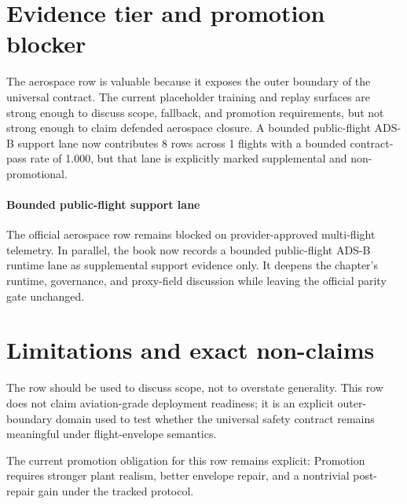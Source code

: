 \section{{Evidence tier and promotion blocker}}
The aerospace row is valuable because it exposes the outer boundary of the universal contract. The current placeholder training and replay surfaces are strong enough to discuss scope, fallback, and promotion requirements, but not strong enough to claim defended aerospace closure. A bounded public-flight ADS-B support lane now contributes 8 rows across 1 flights with a bounded contract-pass rate of 1.000, but that lane is explicitly marked supplemental and non-promotional.


\paragraph{Bounded public-flight support lane}
The official aerospace row remains blocked on provider-approved multi-flight telemetry.
In parallel, the book now records a bounded public-flight ADS-B runtime lane as supplemental
support evidence only.  It deepens the chapter's runtime, governance, and proxy-field
discussion while leaving the official parity gate unchanged.




\section{{Limitations and exact non-claims}}
The row should be used to discuss scope, not to overstate generality. This row does not claim aviation-grade deployment readiness; it is an explicit outer-boundary domain used to test whether the universal safety contract remains meaningful under flight-envelope semantics.

The current promotion obligation for this row remains explicit: Promotion requires stronger plant realism, better envelope repair, and a nontrivial post-repair gain under the tracked protocol.
